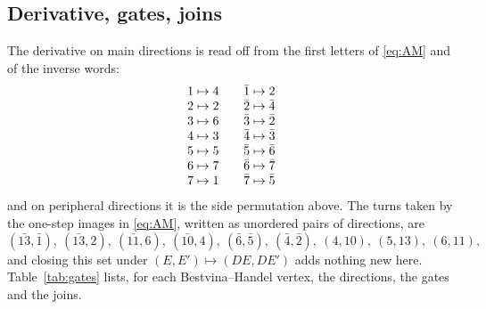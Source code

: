 \documentclass[12pt]{amsart}
\newcommand{\anti}[1]{\bar{#1}}          %
\newcommand{\Dg}{D}                       %
\theoremstyle{plain}
\theoremstyle{definition}
\begin{document}
\subsection{Derivative, gates, joins}
The derivative on main directions is read off from the first letters of
\eqref{eq:AM} and of the inverse words:
\[
  \begin{array}{r@{\;\mapsto\;}l@{\qquad}r@{\;\mapsto\;}l}
    1 & 4 & \anti1 & 2 \\
    2 & 2 & \anti2 & \anti4 \\
    3 & 6 & \anti3 & \anti2 \\
    4 & 3 & \anti4 & \anti3 \\
    5 & 5 & \anti5 & \anti6 \\
    6 & 7 & \anti6 & \anti7 \\
    7 & 1 & \anti7 & \anti5
  \end{array}
\]
and on peripheral directions it is the side permutation above.  The turns
taken by the one-step images in \eqref{eq:AM}, written as unordered pairs
of directions, are
\[
  (\anti{13},\anti1),\ (\anti{13},2),\ (\anti{11},6),\ (\anti{10},4),\
  (\anti6,\anti5),\ (\anti4,\anti2),\ (4,10),\ (5,13),\ (6,11),
\]
and closing this set under $(E,E')\mapsto(\Dg E,\Dg E')$ adds nothing
new here.  Table~\ref{tab:gates} lists, for each Bestvina--Handel vertex,
the directions, the gates and the joins.
\end{document}
